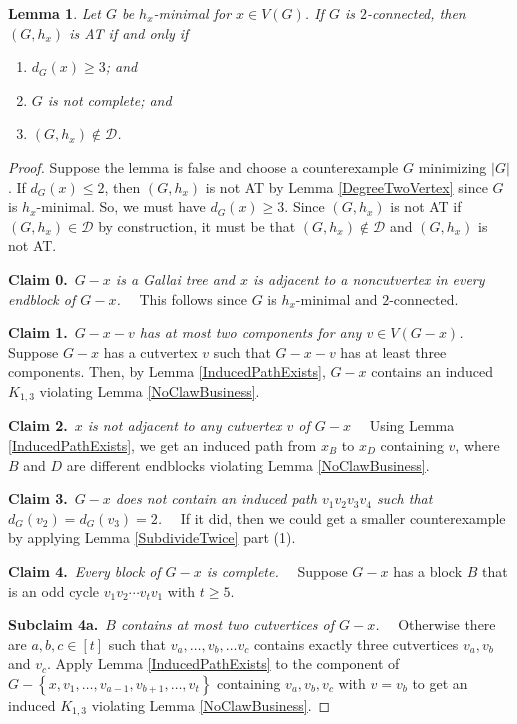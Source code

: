 \documentclass[12pt]{article}
\theoremstyle{plain}
\newtheorem{lem}[thm]{Lemma}
\theoremstyle{definition}
\theoremstyle{remark}
\newcommand{\fancy}[1]{\mathcal{#1}}
\newcommand{\D}{\fancy{D}}
\newcommand{\set}[1]{\left\{ #1 \right\}}
\newcommand{\card}[1]{\left|#1\right|}
\newcommand{\irange}[1]{\left[#1\right]}
\def\D{\fancy{D}}
\newcommand{\claim}[2]{{\bf Claim #1.}~{\it #2}~~}
\newcommand{\subclaim}[2]{{\bf Subclaim #1.}~{\it #2}~~}
\begin{document}
\begin{lem}\label{TwoConnectedClassification}
	Let $G$ be $h_x$-minimal for $x \in V(G)$.  If $G$ is $2$-connected, then $(G,h_x)$ is AT if and only if 
	\begin{enumerate}
		\item $d_G(x) \ge 3$; and
		\item $G$ is not complete; and
		\item $(G,h_x) \not \in \D$.
	\end{enumerate}
\end{lem}
\begin{proof}
	Suppose the lemma is false and choose a counterexample $G$ minimizing $\card{G}$.  If $d_G(x) \le 2$, then $(G,h_x)$ is not AT by Lemma \ref{DegreeTwoVertex} since $G$ is $h_x$-minimal.  So, we must have $d_G(x) \ge 3$.  Since $(G,h_x)$ is not AT if $(G,h_x) \in \D$ by construction, it must be that $(G,h_x) \not \in \D$ and $(G,h_x)$ is not AT.   
	
	\claim{0}{$G-x$ is a Gallai tree and $x$ is adjacent to a noncutvertex in every endblock of $G-x$.}
	 This follows since $G$ is $h_x$-minimal and $2$-connected.
	
	 \claim{1}{$G-x-v$ has at most two components for any $v \in V(G-x)$.}
      Suppose $G-x$ has a cutvertex $v$ such that $G-x-v$ has at least three components.  Then, by Lemma \ref{InducedPathExists}, $G-x$ contains an induced $K_{1,3}$ violating Lemma \ref{NoClawBusiness}.
      
     \claim{2}{$x$ is not adjacent to any cutvertex $v$ of $G-x$}
      Using Lemma \ref{InducedPathExists}, we get an induced path from $x_B$ to $x_D$ containing $v$, where $B$ and $D$ are different endblocks violating Lemma \ref{NoClawBusiness}.
      
     \claim{3}{$G-x$ does not contain an induced path $v_1v_2v_3v_4$ such that $d_G(v_2) = d_G(v_3) = 2$.}
      If it did, then we could get a smaller counterexample by applying Lemma \ref{SubdivideTwice} part (1).
      
     \claim{4}{Every block of $G-x$ is complete.}
      Suppose $G-x$ has a block $B$ that is an odd cycle $v_1v_2\cdots v_tv_1$ with $t \ge 5$.
      
      \subclaim{4a}{$B$ contains at most two cutvertices of $G-x$.}
	  Otherwise there are $a,b,c \in \irange{t}$ such that $v_a, \ldots, v_b, \ldots v_c$ contains exactly three cutvertices $v_a, v_b$ and $v_c$.  Apply Lemma \ref{InducedPathExists} to the component of $G-\set{x,v_1, \ldots, v_{a-1}, v_{b+1}, \ldots, v_t}$ containing $v_a, v_b, v_c$ with $v = v_b$ to get an induced $K_{1,3}$ violating Lemma \ref{NoClawBusiness}. 
	  

\end{proof}
\end{document}
